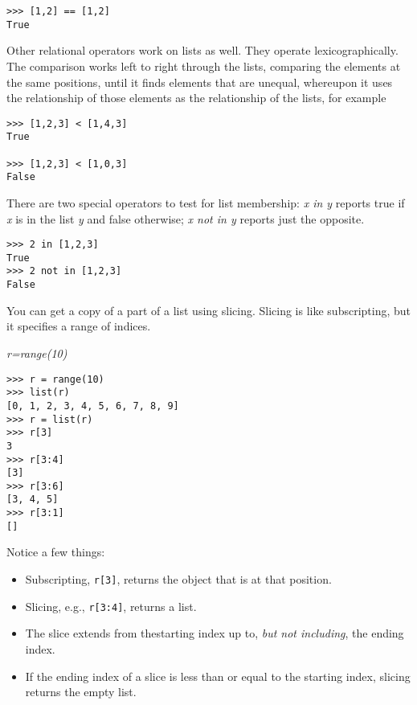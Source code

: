\begin{verbatim}
>>> [1,2] == [1,2]
True
\end{verbatim}



Other relational operators work on
lists as well. They operate lexicographically. The comparison works left
to right through the lists, comparing the elements at the same
positions, until it finds elements that are unequal, whereupon it uses
the relationship of those elements as the relationship of the lists, for
example

\begin{verbatim}
>>> [1,2,3] < [1,4,3]
True

>>> [1,2,3] < [1,0,3]
False    
\end{verbatim}

There are two special operators to
test for list membership: \emph{x in y} reports true if \emph{x} is in
the list \emph{y} and false otherwise; \emph{x not in y} reports just
the opposite.

\begin{verbatim}
>>> 2 in [1,2,3]
True
>>> 2 not in [1,2,3]
False  
\end{verbatim}

You can get a copy of a part of a
list using slicing. Slicing is like subscripting, but it specifies a
range of indices.


\emph{r=range(10)}

\begin{verbatim}
>>> r = range(10)
>>> list(r)
[0, 1, 2, 3, 4, 5, 6, 7, 8, 9]
>>> r = list(r)
>>> r[3]
3
>>> r[3:4]
[3]
>>> r[3:6]
[3, 4, 5]
>>> r[3:1]
[]
\end{verbatim}

Notice a few things:

\begin{itemize}
\item
  Subscripting, \verb"r[3]", returns the object that is at that position.
\item
  Slicing, e.g., \verb"r[3:4]", returns a list.
\item
  The slice extends from thestarting index up to, \emph{but not including}, the ending index.
\item
  If the ending index of a slice is less than or equal to the starting index, slicing returns the empty list.
\end{itemize}


